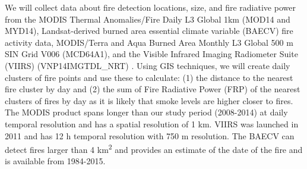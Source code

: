 \documentclass[authoryear]{elsarticle}
\begin{document}



We will collect data about fire detection locations, size, and fire radiative power from the MODIS Thermal Anomalies/Fire Daily L3 Global 1km (MOD14 and MYD14), Landsat-derived burned area essential climate variable (BAECV) fire activity data, MODIS/Terra and Aqua Burned Area Monthly L3 Global 500 m SIN Grid V006 (MCD64A1), and the Visible Infrared Imaging Radiometer Suite (VIIRS) (VNP14IMGTDL\_NRT) 
\citep{Giglio2006,Hawbaker2017,MODISBurnArea,Schroeder2014}. 
Using GIS techniques, we will create daily clusters of fire points and use these to calculate: (1) the distance to the nearest fire cluster by day and (2) the sum of Fire Radiative Power (FRP) of the nearest clusters of fires by day as it is likely that smoke levels are higher closer to fires. The MODIS product spans longer than our study period (2008-2014) at daily temporal resolution and has a spatial resolution of 1 km. VIIRS was launched in 2011 and has 12 h temporal resolution with 750 m resolution. The BAECV can detect fires larger than 4 km\textsuperscript{2} and provides an estimate of the date of the fire and is available from 1984-2015. 

\end{document}
